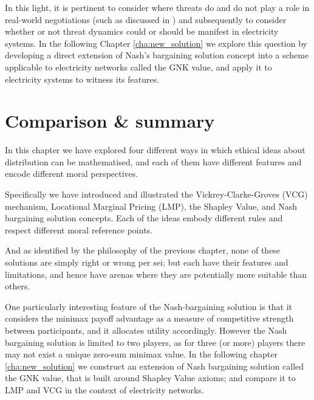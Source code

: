 In this light, it is pertinent to consider where threats do and do not play a role in real-world negotiations (such as discussed in \cite{anbarci2002comparing}) and subsequently to consider whether or not threat dynamics could or should be manifest in electricity systems.
In the following Chapter \ref{cha:new_solution} we explore this question by developing a direct extension of Nash's bargaining solution concept into a scheme applicable to electricity networks called the GNK value, and apply it to electricity systems to witness its features.%



\section{Comparison \& summary}

In this chapter we have explored four different ways in which ethical ideas about distribution can be mathematised, and each of them have different features and encode different moral perspectives.

Specifically we have introduced and illustrated the Vickrey-Clarke-Groves (VCG) mechanism, Locational Marginal Pricing (LMP), the Shapley Value, and Nash bargaining solution concepts.
Each of the ideas embody different rules and respect different moral reference points.

And as identified by the philosophy of the previous chapter, none of these solutions are simply right or wrong per sei; but each have their features and limitations, and hence have arenas where they are potentially more suitable than others.

One particularly interesting feature of the Nash-bargaining solution is that it considers the minimax payoff advantage as a measure of competitive strength between participants, and it allocates utility accordingly.
However the Nash bargaining solution is limited to two players, as for three (or more) players there may not exist a unique zero-sum minimax value.
In the following chapter \ref{cha:new_solution} we construct an extension of Nash bargaining solution called the GNK value, that is built around Shapley Value axioms; and compare it to LMP and VCG in the context of electricity networks.




